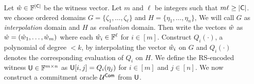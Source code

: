 Let $\hat{w} \in \mathbb{F}^{|\mathsf{C}|}$ be the witness vector. Let $m$ and $\ell$ be integers such that $m\ell\geq \mathsf{|C|}$. we choose ordered domains $G=\{\zeta_1,\ldots,\zeta_\ell\}$ and $H=\{\eta_1,\ldots,\eta_n\}$, We will call $G$ as {\em interpolation} domain and $H$ as {\em evaluation} domain. Then write the vectors $\hat{w}$ as $\hat{w} = (\hat{w}_{1},\ldots,\hat{w}_{m})$ where each $\hat{w}_{i}\in \mathbb{F}^\ell$ for $i \in [m]$. Construct $Q_i(\cdot)$, a polynomial of degree $<k$, by interpolating the vector $\hat{w}_{i}$ on $G$ and $Q_{i}(\cdot)$ denotes the corresponding evaluation of $Q_{i}$ on $H$. We define the RS-encoded witness $\mathsf{U}\in \mathbb{F}^{m\times n}$ as $\mathsf{U}[i,j]=Q_{i}(\eta_j)$ for $ i\in [m]$ and $j\in [n]$. We now construct a commitment oracle $\mathcal{U}^{\mathsf{Com}}$ from $\mathsf{U}$.
